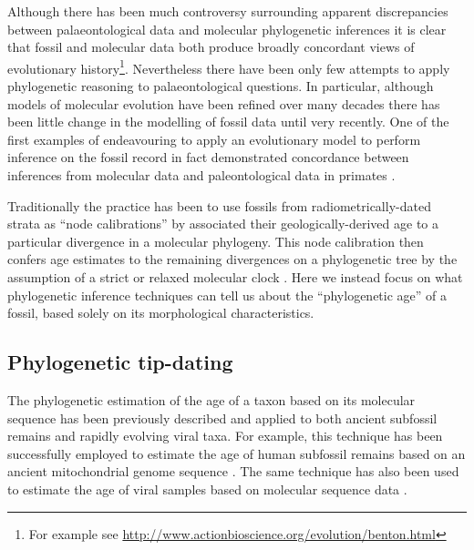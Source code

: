 \documentclass[11pt]{article}
\begin{document}
Although there has been much controversy surrounding apparent discrepancies between palaeontological data and molecular phylogenetic inferences it is clear that fossil and molecular data both produce broadly concordant views of evolutionary history\footnote{For example see \url{http://www.actionbioscience.org/evolution/benton.html}}. Nevertheless there have been only few attempts to apply phylogenetic reasoning to palaeontological questions. In particular, although models of molecular evolution have been refined over many decades \autocite{Felsenstein2004,Yang:2006yu} there has been little change in the modelling of fossil data until very recently. One of the first examples of endeavouring to apply an evolutionary model to perform inference on the fossil record in fact demonstrated concordance between inferences from  molecular data and paleontological data in primates \autocite{tavare2002using}. 

Traditionally the practice has been to use fossils from radiometrically-dated strata as ``node calibrations'' by associated their geologically-derived age to a particular divergence in a molecular phylogeny. This node calibration then confers age estimates to the remaining divergences on a phylogenetic tree by the assumption of a strict or relaxed molecular clock \autocite{Thorne1998,thorne2005,yang2006,Drummond2006}. 
Here we instead focus on what phylogenetic inference techniques can tell us about the ``phylogenetic age'' of a fossil, based solely on its morphological characteristics.

\subsection*{Phylogenetic tip-dating}

The phylogenetic estimation of the age of a taxon based on its molecular sequence has been previously described \autocite{drummond2002computational,shapiro2011bayesian} and applied to both ancient subfossil remains and rapidly evolving viral taxa. For example, this technique has been successfully employed to estimate the age of human subfossil remains based on an ancient mitochondrial genome sequence \autocite{meyer2014mitochondrial}. The same technique has also been used to estimate the age of viral samples based on molecular sequence data \autocite[e.g.][]{gray2013evolutionary}.
\end{document}
